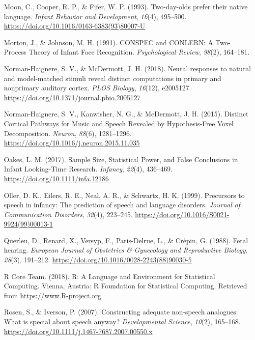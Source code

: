 \documentclass[man]{apa6}
\begin{document}
\hypertarget{ref-moon_two-day-olds_1993}{}
Moon, C., Cooper, R. P., \& Fifer, W. P. (1993). Two-day-olds prefer
their native language. \emph{Infant Behavior and Development},
\emph{16}(4), 495--500.
\url{https://doi.org/10.1016/0163-6383(93)80007-U}

\hypertarget{ref-morton_conspec_1991}{}
Morton, J., \& Johnson, M. H. (1991). CONSPEC and CONLERN: A Two-Process
Theory of Infant Face Recognition. \emph{Psychological Review},
\emph{98}(2), 164--181.

\hypertarget{ref-norman-haignere_neural_2018}{}
Norman-Haignere, S. V., \& McDermott, J. H. (2018). Neural responses to
natural and model-matched stimuli reveal distinct computations in
primary and nonprimary auditory cortex. \emph{PLOS Biology},
\emph{16}(12), e2005127.
\url{https://doi.org/10.1371/journal.pbio.2005127}

\hypertarget{ref-norman-haignere_distinct_2015}{}
Norman-Haignere, S. V., Kanwisher, N. G., \& McDermott, J. H. (2015).
Distinct Cortical Pathways for Music and Speech Revealed by
Hypothesis-Free Voxel Decomposition. \emph{Neuron}, \emph{88}(6),
1281--1296. \url{https://doi.org/10.1016/j.neuron.2015.11.035}

\hypertarget{ref-oakes_sample_2017}{}
Oakes, L. M. (2017). Sample Size, Statistical Power, and False
Conclusions in Infant Looking-Time Research. \emph{Infancy},
\emph{22}(4), 436--469. \url{https://doi.org/10.1111/infa.12186}

\hypertarget{ref-oller_precursors_1999}{}
Oller, D. K., Eilers, R. E., Neal, A. R., \& Schwartz, H. K. (1999).
Precursors to speech in infancy: The prediction of speech and language
disorders. \emph{Journal of Communication Disorders}, \emph{32}(4),
223--245. \url{https://doi.org/10.1016/S0021-9924(99)00013-1}

\hypertarget{ref-querleu_fetal_1988}{}
Querleu, D., Renard, X., Versyp, F., Paris-Delrue, L., \& Crèpin, G.
(1988). Fetal hearing. \emph{European Journal of Obstetrics \&
Gynecology and Reproductive Biology}, \emph{28}(3), 191--212.
\url{https://doi.org/10.1016/0028-2243(88)90030-5}

\hypertarget{ref-r_core_team_r:_2018}{}
R Core Team. (2018). R: A Language and Environment for Statistical
Computing. Vienna, Austria: R Foundation for Statistical Computing.
Retrieved from \url{https://www.R-project.org}

\hypertarget{ref-rosen_constructing_2007}{}
Rosen, S., \& Iverson, P. (2007). Constructing adequate non-speech
analogues: What is special about speech anyway? \emph{Developmental
Science}, \emph{10}(2), 165--168.
\url{https://doi.org/10.1111/j.1467-7687.2007.00550.x}
\end{document}
